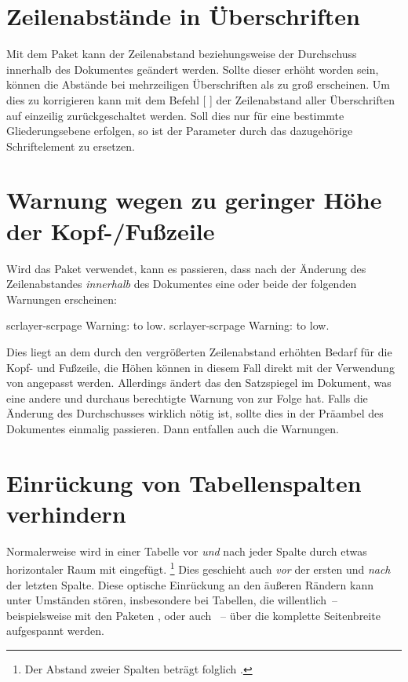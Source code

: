 \section{Zeilenabstände in Überschriften}
%
%
Mit dem Paket  kann der Zeilenabstand beziehungsweise der 
Durchschuss innerhalb des Dokumentes geändert werden. Sollte dieser erhöht 
worden sein, können die Abstände bei mehrzeiligen Überschriften als zu groß 
erscheinen. Um dies zu korrigieren kann mit dem Befehl 
[%
] der Zeilenabstand aller Überschriften auf einzeilig zurückgeschaltet werden. 
Soll dies nur für eine bestimmte Gliederungsebene erfolgen, so ist der 
Parameter  durch das dazugehörige Schriftelement zu 
ersetzen.



\section{Warnung wegen zu geringer Höhe der Kopf-/Fußzeile}
%
%
Wird das Paket  verwendet, kann es passieren, dass nach der 
Änderung des Zeilenabstandes \emph{innerhalb} des Dokumentes eine oder beide 
der folgenden Warnungen erscheinen:
%
\begin{quoting}
\begin{Code}
scrlayer-scrpage Warning: \headheight to low.
scrlayer-scrpage Warning: \footheight to low.
\end{Code}
\end{quoting}
%
Dies liegt an dem durch den vergrößerten Zeilenabstand erhöhten Bedarf für die
Kopf- und Fußzeile, die Höhen können in diesem Fall direkt mit der Verwendung 
von  angepasst werden. Allerdings ändert das den 
Satzspiegel im Dokument, was eine andere und durchaus berechtigte Warnung von 
 zur Folge hat. Falls die Änderung des Durchschusses wirklich 
nötig ist, sollte dies in der Präambel des Dokumentes einmalig passieren. Dann 
entfallen auch die Warnungen.



\section{Einrückung von Tabellenspalten verhindern}%
%
%
Normalerweise wird in einer Tabelle vor \emph{und} nach jeder Spalte durch 
 etwas horizontaler Raum mit  
eingefügt.%
\footnote{%
  Der Abstand zweier Spalten beträgt folglich .%
}
Dies geschieht auch \emph{vor} der ersten und \emph{nach} der letzten Spalte. 
Diese optische Einrückung an den äußeren Rändern kann unter Umständen stören, 
insbesondere bei Tabellen, die willentlich~-- beispielsweise mit den Paketen 
,  oder auch ~-- über die 
komplette Seitenbreite aufgespannt werden.

